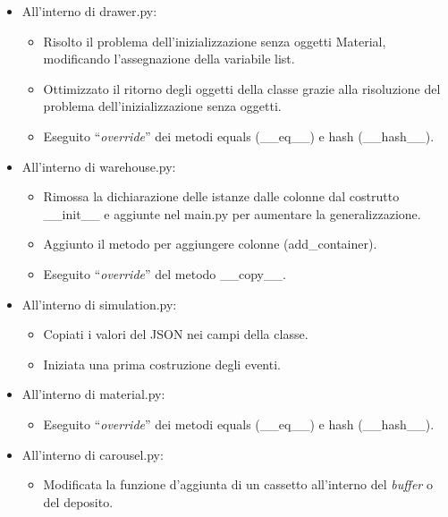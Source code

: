 \documentclass[a4paper]{article}
\newcommand{\dquotes}[1]{``#1''}
\begin{document}
\begin{itemize}[label=]
		\item All'interno di \textsf{drawer.py}:
			\begin{itemize}
				\item Risolto il problema dell'inizializzazione senza oggetti \textsf{Material}, modificando l'assegnazione della variabile \textsf{list}.
				
				\item Ottimizzato il ritorno degli oggetti della classe grazie alla risoluzione del problema dell'inizializzazione senza oggetti.
				
				\item Eseguito \dquotes{\emph{override}} dei metodi \textsf{equals (\_\_eq\_\_)} e \textsf{hash (\_\_hash\_\_)}.
			\end{itemize}
		
		\item All'interno di \textsf{warehouse.py}:
			\begin{itemize}
				\item Rimossa la dichiarazione delle istanze dalle colonne dal costrutto \textsf{\_\_init\_\_} e aggiunte nel \textsf{main.py} per aumentare la generalizzazione.
				
				\item Aggiunto il metodo per aggiungere colonne (\textsf{add\_container}).
				
				\item Eseguito \dquotes{\emph{override}} del metodo \textsf{\_\_copy\_\_}.
			\end{itemize}
		
		\item All'interno di \textsf{simulation.py}:
			\begin{itemize}
				\item Copiati i valori del \textsf{JSON} nei campi della classe.
				
				\item Iniziata una prima costruzione degli eventi.
			\end{itemize}
		
		\item All'interno di \textsf{material.py}:
			\begin{itemize}
				\item Eseguito \dquotes{\emph{override}} dei metodi \textsf{equals (\_\_eq\_\_)} e \textsf{hash (\_\_hash\_\_)}.
			\end{itemize}
		
		\item All'interno di \textsf{carousel.py}:
			\begin{itemize}
				\item Modificata la funzione d'aggiunta di un cassetto all'interno del \emph{buffer} o del deposito.
			\end{itemize}
	\end{itemize}
\end{document}
